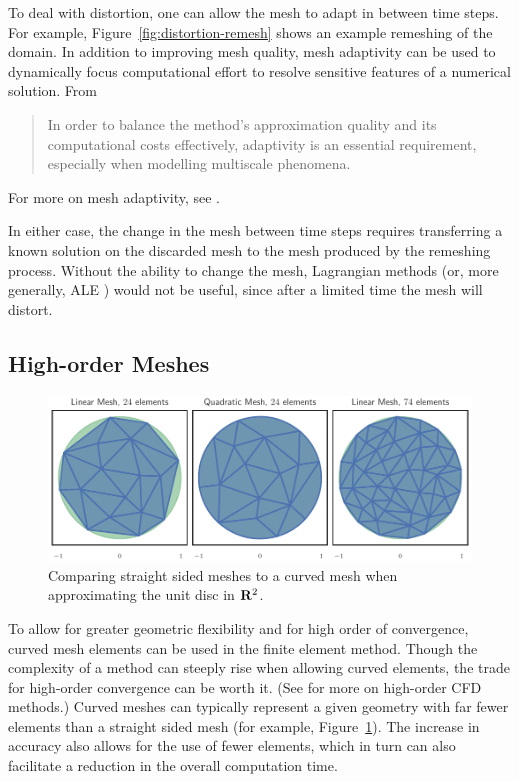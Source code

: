 To deal with distortion, one can allow the mesh to adapt in between time
steps. For example, Figure~\ref{fig:distortion-remesh} shows an example
remeshing of the domain.
In addition to improving mesh quality, mesh
adaptivity can be used to dynamically focus computational effort to resolve
sensitive features of a numerical solution. From \cite{Iske2004}
\begin{quote}
{\small In order to balance the method's approximation quality and its
computational costs effectively, adaptivity is an essential requirement,
especially when modelling multiscale phenomena.}
\end{quote}
For more on mesh adaptivity, see \cite{Babuska1978, Peraire1987, Pain2001}.

In either case, the change in the
mesh between time steps requires transferring a known solution on the
discarded mesh to the mesh produced by the remeshing process. Without
the ability to change the mesh, Lagrangian methods (or, more generally,
ALE \cite{Hirt1974}) would not be useful, since after a limited time the
mesh will distort.

\subsection{High-order Meshes}

\begin{figure}
  \includegraphics{../images/solution-transfer/main_figure27.pdf}
  \centering
  \captionsetup{width=.75\linewidth}
  \caption{Comparing straight sided meshes to a curved mesh when approximating
    the unit disc in \(\mathbf{R}^2\).}
  \label{fig:curved-vs-straight-mesh}
\end{figure}

To allow for greater geometric flexibility and for high order of convergence,
curved mesh elements can be used in the finite element method. Though the
complexity of a method can steeply rise when allowing curved elements, the
trade for high-order convergence can be worth it. (See \cite{Wang2013} for
more on high-order CFD methods.) Curved meshes can typically
represent a given geometry with far fewer elements than a straight sided mesh
(for example, Figure~\ref{fig:curved-vs-straight-mesh}).
The increase in accuracy also allows for the use of fewer elements, which
in turn can also facilitate a reduction in the overall computation time.


